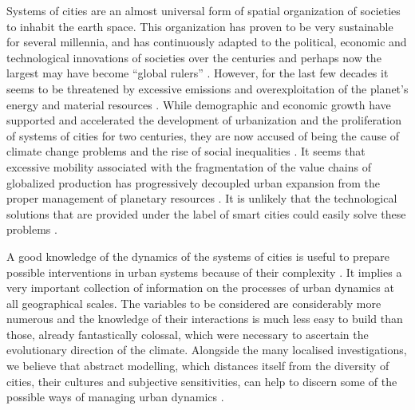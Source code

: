 \documentclass[final,5p,times,twocolumn,authoryear]{elsarticle}
\begin{document}
Systems of cities are an almost universal form of spatial organization of societies to inhabit the earth space. This organization has proven to be very sustainable for several millennia, and has continuously adapted to the political, economic and technological innovations of societies over the centuries \citep{pumain2020theories} and perhaps now the largest may have become ``global rulers'' \citep{glaeser2020urban}. However, for the last few decades it seems to be threatened by excessive emissions and overexploitation of the planet's energy and material resources \citep{nijkamp2014sustainable,kourtit2020global}. While demographic and economic growth have supported and accelerated the development of urbanization and the proliferation of systems of cities for two centuries, they are now accused of being the cause of climate change problems and the rise of social inequalities \citep{davis2006planet,glaeser2009inequality}. It seems that excessive mobility associated with the fragmentation of the value chains of globalized production has progressively decoupled urban expansion from the proper management of planetary resources \citep{rozenblat2018urban}. It is unlikely that the technological solutions that are provided under the label of smart cities could easily solve these problems \citep{caragliu2011smart,kourtit2020global}.

A good knowledge of the dynamics of the systems of cities is useful to prepare possible interventions in urban systems because of their complexity \citep{reggiani2021reflections}. It implies a very important collection of information on the processes of urban dynamics at all geographical scales. The variables to be considered are considerably more numerous and the knowledge of their interactions is much less easy to build than those, already fantastically colossal, which were necessary to ascertain the evolutionary direction of the climate. Alongside the many localised investigations, we believe that abstract modelling, which distances itself from the diversity of cities, their cultures and subjective sensitivities, can help to discern some of the possible ways of managing urban dynamics \citep{pumain2017urban}.
\end{document}
